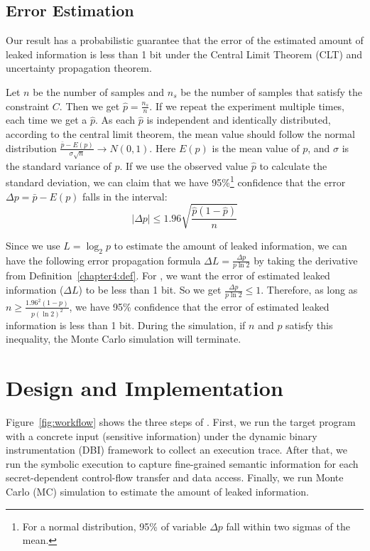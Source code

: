 \subsection{Error Estimation}
\label{sssec:errest}
Our result has a probabilistic guarantee that the error of the estimated amount of leaked
information is less than 1 bit under the Central Limit Theorem (CLT) and uncertainty
propagation theorem.

Let $n$ be the number of samples and $n_s$ be the number of samples that satisfy
the constraint $C$. Then we get $\hat{p} = \frac{n_s}{n}$. If we repeat the
experiment multiple times, each time we get a $\hat{p}$. As each
$\hat{p}$ is independent and identically distributed, according to the central limit
theorem, the mean value should follow the normal distribution
$ \frac{\bar{p}-E(p)}{\sigma\sqrt{n}} \rightarrow N(0,1) $. Here $E(p)$ is the
mean value of $p$, and $\sigma$ is the standard variance of $p$. If we use the
observed value $\hat{p}$ to calculate the standard deviation, we can claim that
we have 95\%\footnote{For a normal distribution, 95\% of variable $\Delta p$ fall within two sigmas of the mean.}
confidence that the error $\Delta p= \bar{p} - E(p)$ falls in the interval:
$$ |\Delta p| \leq 1.96\sqrt{\frac{ \hat{p} (1- \hat{p} )}{n}}$$

Since we use $L = \log_{2}p$ to estimate the amount of leaked information, we
can have the following error propagation formula $\Delta L = \frac{\Delta
        p}{p\ln2}$ by taking the derivative from Definition~\ref{chapter4:def}. For \tool, we want the error of estimated leaked
information ($\Delta L$) to be less than 1 bit. So we get $\frac{\Delta
        p}{p\ln2} \leq 1$. Therefore, as long as $ n \geq \frac{1.96^2(1-p)}{p(\ln2)^2}$, we have
95\% confidence that the error of estimated leaked information is less than 1 bit.
During the simulation, if $n$ and $p$ satisfy this inequality, the Monte Carlo
simulation will terminate.

\section{Design and Implementation}

Figure~\ref{fig:workflow} shows the three steps of \tool{}.
First, we run the target program with a
concrete input (sensitive information) under the dynamic binary instrumentation
(DBI) framework to collect an execution trace. After that, we run the symbolic
execution to capture fine-grained semantic information for each
secret-dependent control-flow transfer and data access. Finally, we run Monte
Carlo (MC) simulation to estimate the amount of leaked information.

